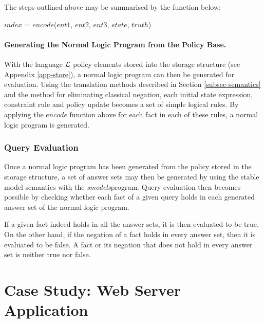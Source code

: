 \documentclass[global,twocolumn,final]{svjour}
\newenvironment{vquote}
  {\begin{list}{}{\leftmargin 1em}\item[]}
  {\end{list}}
\begin{document}
          The steps outlined above may be summarised by the function below:

          \begin{vquote}
            $index$ = $encode$($ent1$, $ent2$, $ent3$, $state$, $truth$)
          \end{vquote}

        \paragraph{Generating the Normal Logic Program from the Policy Base.}

          With the language ${\cal L}$ policy elements stored into the storage
          structure (see Appendix \ref{app-store}), a normal logic program can
          then be generated for evaluation. Using the translation methods
          described in Section \ref{subsec-semantics} and the method for
          eliminating classical negation, each initial state expression,
          constraint rule and policy update becomes a set of simple logical
          rules. By applying the $encode$ function above for each fact in each
          of these rules, a normal logic program is generated.

      \subsubsection{Query Evaluation}

        Once a normal logic program has been generated from the policy stored
        in the storage structure, a set of answer sets may then be generated
        by using the stable model semantics \cite{SIM} with the
        {\em smodels}\footnotemark program. Query evaluation then becomes
        possible by checking whether each fact of a given query holds in each
        generated answer set of the normal logic program.


        If a given fact indeed holds in all the answer sets, it is then
        evaluated to be true. On the other hand, if the negation of a fact
        holds in every answer set, then it is evaluated to be false. A fact
        or its negation that does not hold in every answer set is neither true
        nor false.

  \section{Case Study: Web Server Application}
    \label{sec-case}
\end{document}

